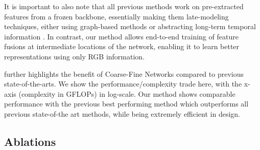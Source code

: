 \documentclass[final]{cvpr}
\begin{document}
It is important to also note that all previous methods work on pre-extracted features from a frozen backbone, essentially making them late-modeling techniques, either using graph-based methods \cite{ghosh2020stacked,mavroudi2020representation} or abstracting long-term temporal information \cite{piergiovanni2018learning, piergiovanni2019temporal}. In contrast, our method allows end-to-end training of feature fusions at intermediate locations of the network, enabling it to learn better representations using only RGB information.



 further highlights the benefit of Coarse-Fine Networks compared to previous state-of-the-arts. We show the performance/complexity trade here, with the x-axis (complexity in GFLOPs) in log-scale. Our method shows comparable performance with the previous best performing method which outperforms all previous state-of-the art methods, while being extremely efficient in design. 


\vspace{-1mm}
\subsection{Ablations}
\label{subsubsec:ablations}
\vspace{-1mm}
\end{document}
